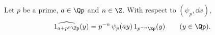 Let $p$ be a prime, $a\in\Qp$ and $n\in\Z$. With respect to $(\psi_p,\dd x)$,
\[
  \widehat{1_{a+p^n\Zp}}(y)=p^{-n}\,\psi_p(ay)\,1_{p^{-n}\Zp}(y)\qquad(y\in\Qp).
\]
